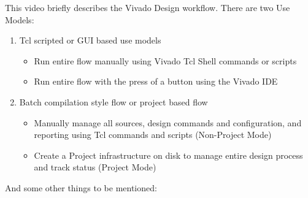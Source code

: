 This video briefly describes the Vivado Design workflow. There are two
Use Models:
\begin{enumerate}
\item Tcl scripted or GUI based use models
\begin{itemize}
\item Run entire flow manually using Vivado Tcl Shell commands or scripts
\item Run entire flow with the press of a button using the Vivado IDE
\end{itemize}
\item Batch compilation style flow or project based flow
\begin{itemize}
\item Manually manage all sources, design commands and configuration, and
reporting using Tcl commands and scripts (Non-Project Mode)
\item Create a Project infrastructure on disk to manage entire design
process and track status (Project Mode)
\end{itemize}
\end{enumerate}
And some other things to be mentioned:
